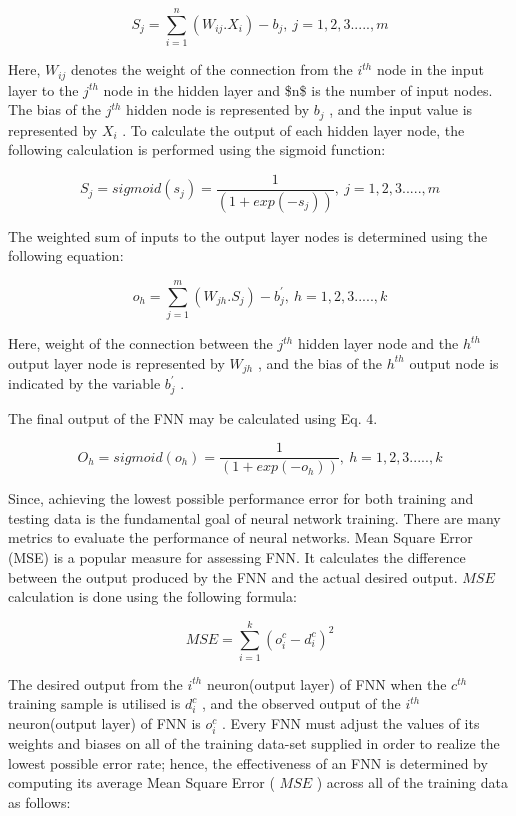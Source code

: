 \begin{equation}
S_{j}=\sum_{i=1}^{n}(W_{i j}.X_{i})-b_{j},~j=1,2,3.....,m
\end{equation}

Here, $W_{i j}$ denotes the weight of the connection from the $i^{t h}$ node in the input layer to the $j^{t h}$ node in the hidden layer and \$n\$ is the number of input nodes. The bias of the $j^{t h}$ hidden node is represented by $b_{j}$ , and the input value is represented by $X_{i}$ . To calculate the output of each hidden layer node, the following calculation is performed using the sigmoid function:

\begin{equation}
S_{j}=s i g m o i d(s_{j})=\frac{1}{(1+e x p(-s_{j}))},~j=1,2,3.....,m
\end{equation}

The weighted sum of inputs to the output layer nodes is determined using the following equation:

\begin{equation}
o_{h}=\sum_{j=1}^{m}(W_{j h}.S_{j})-b_{j}^{'},~h=1,2,3.....,k
\end{equation}

Here, weight of the connection between the $j^{t h}$ hidden layer node and the $h^{t h}$ output layer node is represented by $W_{j h}$ , and the bias of the $h^{t h}$ output node is indicated by the variable $b_{j}^{'}$ .

The final output of the FNN may be calculated using Eq. 4.

\begin{equation}
O_{h}=s i g m o i d(o_{h})=\frac{1}{(1+e x p(-o_{h}))},~h=1,2,3.....,k
\end{equation}

Since, achieving the lowest possible performance error for both training and testing data is the fundamental goal of neural network training. There are many metrics to evaluate the performance of neural networks. Mean Square Error (MSE) is a popular measure for assessing FNN. It calculates the difference between the output produced by the FNN and the actual desired output. $M S E$ calculation is done using the following formula:

\begin{equation}
M S E=\sum_{i=1}^{k}(o_{i}^{c}-d_{i}^{c})^{2}
\end{equation}

The desired output from the $i^{t h}$ neuron(output layer) of FNN when the $c^{t h}$ training sample is utilised is $d_{i}^{c}$ , and the observed output of the $i^{t h}$ neuron(output layer) of FNN is $o_{i}^{c}$ . Every FNN must adjust the values of its weights and biases on all of the training data-set supplied in order to realize the lowest possible error rate; hence, the effectiveness of an FNN is determined by computing its average Mean Square Error ( $M S E$ ) across all of the training data as follows:

